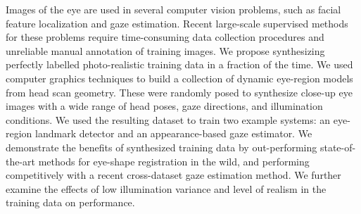 Images of the eye are used in several computer vision problems, such as facial feature localization and gaze estimation.
Recent large-scale supervised methods for these problems require time-consuming data collection procedures and unreliable manual annotation of training images.
We propose synthesizing perfectly labelled photo-realistic training data in a fraction of the time.
We used computer graphics techniques to build a collection of dynamic eye-region models from head scan geometry.
%
These were randomly posed to synthesize close-up eye images with a wide range of head poses, gaze directions, and illumination conditions.
%
We used the resulting dataset to train two example systems: an eye-region landmark detector and an appearance-based gaze estimator.
We demonstrate the benefits of synthesized training data by out-performing state-of-the-art methods for eye-shape registration in the wild, and performing competitively with a recent cross-dataset gaze estimation method.
We further examine the effects of low illumination variance and level of realism in the training data on performance.
%